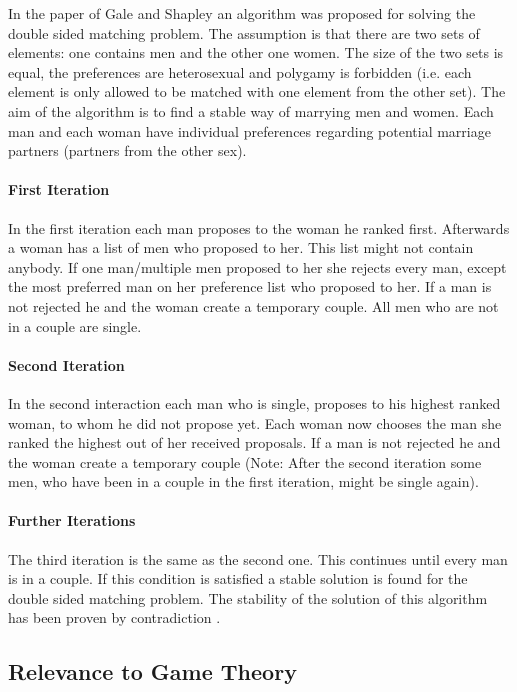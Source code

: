 In the paper of Gale and Shapley \cite{gale62a} an algorithm was proposed for solving the double sided matching problem.
The assumption is that there are two sets of elements: one contains men and the other one women.
The size of the two sets is equal, the preferences are heterosexual and polygamy is forbidden (i.e. each element is only allowed to be matched with one element from the other set).
The aim of the algorithm is to find a stable way of marrying men and women.
Each man and each woman have individual preferences regarding potential marriage partners (partners from the other sex).

\paragraph{First Iteration\\}
In the first iteration each man proposes to the woman he ranked first.
Afterwards a woman has a list of men who proposed to her. This list might not contain anybody. 
If one man/multiple men proposed to her she rejects every man, except the most preferred man on her preference list who proposed to her.
If a man is not rejected he and the woman create a temporary couple.
All men who are not in a couple are single.

\paragraph{Second Iteration\\}
In the second interaction each man who is single, proposes to his highest ranked woman, to whom he did not propose yet.
Each woman now chooses the man she ranked the highest out of her received proposals.
If a man is not rejected he and the woman create a temporary couple (Note: After the second iteration some men, who have been in a couple in the first iteration, might be single again).

\paragraph{Further Iterations\\}
The third iteration is the same as the second one.
This continues until every man is in a couple.
If this condition is satisfied a stable solution is found for the double sided matching problem.
The stability of the solution of this algorithm has been proven by contradiction \cite{gale62a}.

\subsection{Relevance to Game Theory}

